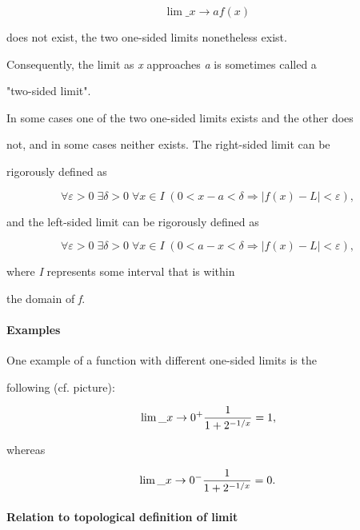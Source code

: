 $$\lim\_{x\to a} f(x)\,$$



does not exist, the two one-sided limits nonetheless exist.

Consequently, the limit as \textit{x} approaches \textit{a} is sometimes called a

"two-sided limit".



In some cases one of the two one-sided limits exists and the other does

not, and in some cases neither exists. The right-sided limit can be

rigorously defined as



$$\forall\varepsilon > 0\;\exists \delta >0 \;\forall x \in I \;(0 < x - a < \delta \Rightarrow |f(x) - L|<\varepsilon),$$



and the left-sided limit can be rigorously defined as



$$\forall\varepsilon > 0\;\exists \delta >0 \;\forall x \in I \;(0 < a - x < \delta \Rightarrow |f(x) - L|<\varepsilon),$$



where \textit{I} represents some interval that is within

the domain of \textit{f}.



\paragraph{Examples}

One example of a function with different one-sided limits is the

following (cf. picture):



$$\lim\_{x \to 0^+}{1 \over 1 + 2^{-1/x}} = 1,$$



whereas



$$\lim\_{x \to 0^-}{1 \over 1 + 2^{-1/x}} = 0.$$






\paragraph{Relation to topological definition of limit}

